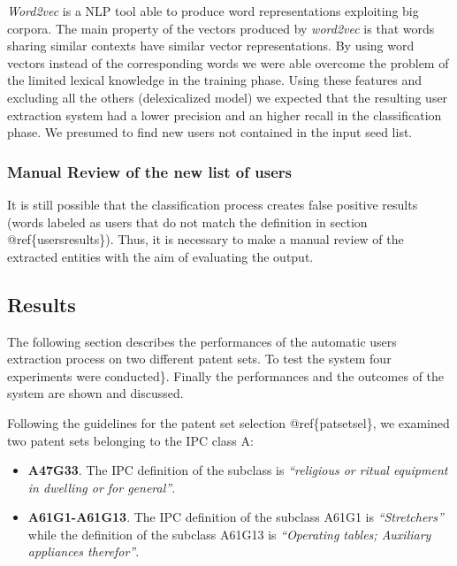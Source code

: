 \documentclass[b5paper,]{book}
\providecommand{\tightlist}{%
  \setlength{\itemsep}{0pt}\setlength{\parskip}{0pt}}
\theoremstyle{definition}
\theoremstyle{definition}
\theoremstyle{definition}
\theoremstyle{remark}
\begin{document}
\emph{Word2vec} is a NLP tool able to produce word representations
exploiting big corpora. The main property of the vectors produced by
\emph{word2vec} is that words sharing similar contexts have similar
vector representations. By using word vectors instead of the
corresponding words we were able overcome the problem of the limited
lexical knowledge in the training phase. Using these features and
excluding all the others (delexicalized model) we expected that the
resulting user extraction system had a lower precision and an higher
recall in the classification phase. We presumed to find new users not
contained in the input seed list.

\subsubsection*{Manual Review of the new list of
users}\label{manual-review-of-the-new-list-of-users}

It is still possible that the classification process creates false
positive results (words labeled as users that do not match the
definition in section @ref\{usersresults\}). Thus, it is necessary to
make a manual review of the extracted entities with the aim of
evaluating the output.

\subsection{Results}\label{results}

The following section describes the performances of the automatic users
extraction process on two different patent sets. To test the system four
experiments were conducted\}. Finally the performances and the outcomes
of the system are shown and discussed.

Following the guidelines for the patent set selection @ref\{patsetsel\},
we examined two patent sets belonging to the IPC class A:

\begin{itemize}
\tightlist
\item
  \textbf{A47G33}. The IPC definition of the subclass is
  \emph{``religious or ritual equipment in dwelling or for general''}.
\item
  \textbf{A61G1-A61G13}. The IPC definition of the subclass A61G1 is
  \emph{``Stretchers''} while the definition of the subclass A61G13 is
  \emph{``Operating tables; Auxiliary appliances therefor''}.
\end{itemize}
\end{document}
